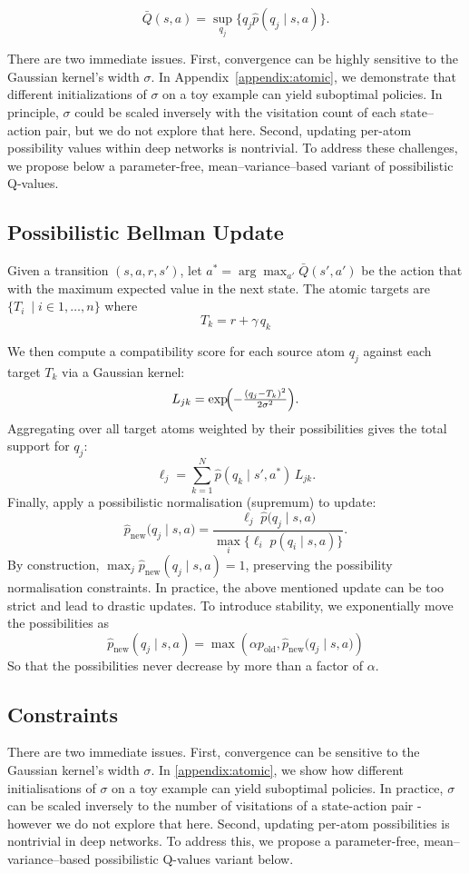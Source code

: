 \documentclass[11pt,a4paper]{report}
\begin{document}
\[ \bar{Q}(s,a)= \sup_{q_j}\{q_j \hat{p}(q_j \mid s, a)\}. \]

There are two immediate issues. First, convergence can be highly sensitive to the Gaussian kernel’s width \(\sigma\). In Appendix~\ref{appendix:atomic}, we demonstrate that different initializations of \(\sigma\) on a toy example can yield suboptimal policies. In principle, \(\sigma\) could be scaled inversely with the visitation count of each state–action pair, but we do not explore that here. Second, updating per-atom possibility values within deep networks is nontrivial. To address these challenges, we propose below a parameter-free, mean–variance–based variant of possibilistic Q-values.

\subsection{Possibilistic Bellman Update}
Given a transition $(s,a,r,s')$, let $a^*=\arg\max_{a'} \bar{Q}(s',a')$ be the action that with the maximum expected value in the next state. The atomic targets are \(\{T_i\ \mid i \in 1, \dots, n\}\) where
\[ T_k = r + \gamma\,q_k\]

We then compute a compatibility score for each source atom $q_j$ against each target $T_k$ via a Gaussian kernel:
\[
  L_{jk} = \exp\!\Bigl(-\tfrac{(q_j - T_k)^2}{2\sigma^2}\Bigr).
\]
Aggregating over all target atoms weighted by their possibilities gives the total support for $q_j$:
\[
  \ell_j = \sum_{k=1}^N \hat{p}(q_k \mid s', a^*)\,L_{jk}.
\]
Finally, apply a possibilistic normalisation (supremum) to update:
\[
  \hat{p}_{\text{new}}\bigl(q_j \mid s,a\bigr)
  = \frac{\ell_j \; \hat{p}\bigl(q_j \mid s,a\bigr)}{\max_{i}\{\ell_i \; \hat{p}(q_i\mid s,a)\}}. \]
By construction, $\max_j \hat{p}_{\text{new}}(q_j\mid s,a)=1$, preserving the possibility normalisation constraints. In practice, the above mentioned update can be too strict and lead to drastic updates. To introduce stability, we exponentially move the possibilities as 
\[ \hat{p}_{\text{new}}(q_j \mid s,a)  = \max(\alpha p_{\text{old}},\hat{p}_{\text{new}}\bigl(q_j \mid s,a\bigr) )\]
So that the possibilities never decrease by more than a factor of $\alpha$. 

\subsection*{Constraints}

There are two immediate issues. First, convergence can be sensitive to the Gaussian kernel’s width $\sigma$. In \ref{appendix:atomic},  we show how different initialisations of $\sigma$ on a toy example can yield suboptimal policies. In practice, $\sigma$ can be scaled inversely to the number of visitations of a state-action pair - however we do not explore that here. Second, updating per-atom possibilities is nontrivial in deep networks. To address this, we propose a parameter-free, mean–variance–based possibilistic Q-values variant below.
\end{document}
